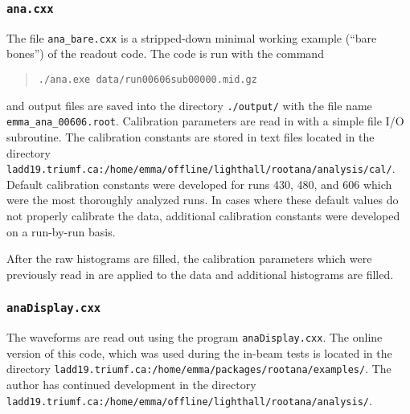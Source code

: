 \subsubsection{\texttt{ana.cxx}}
The file  \texttt{ana\_bare.cxx} is a stripped-down minimal working example (``bare bones'') of the readout code. 
The code is run with the command
\begin{quote}
  \begin{Verbatim}
./ana.exe data/run00606sub00000.mid.gz   
\end{Verbatim}
\end{quote}
and output files are saved into the directory \verb|./output/| with the file name \verb|emma_ana_00606.root|.
Calibration parameters are read in with a simple file I/O subroutine. The calibration constants are stored in text files located in the directory
\verb|ladd19.triumf.ca:/home/emma/offline/lighthall/rootana/analysis/cal/|. Default calibration constants were developed for runs 430, 480, and 606 which were the most thoroughly analyzed runs. In cases where these default values do not properly calibrate the data, additional calibration constants were developed on a run-by-run basis.

  After the raw histograms are filled, the calibration parameters which were previously read in %
are applied to the data and additional histograms are filled.

\subsubsection{\texttt{anaDisplay.cxx}}
The waveforms are read out using the program \texttt{anaDisplay.cxx}. The online version of this code, which was used during the in-beam tests is located in the directory \verb|ladd19.triumf.ca:/home/emma/packages/rootana/examples/|. The author has continued development in the directory \verb|ladd19.triumf.ca:/home/emma/offline/lighthall/rootana/analysis/|.

